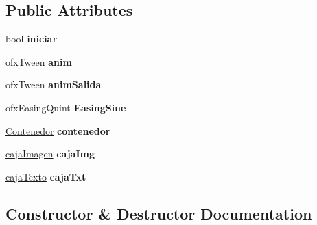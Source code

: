 \subsection*{Public Attributes}
\begin{DoxyCompactItemize}
\item 
\hypertarget{class_rafaga_a080e63c4e672ff07a6578b9f67e6fd0c}{}bool {\bfseries iniciar}\label{class_rafaga_a080e63c4e672ff07a6578b9f67e6fd0c}

\item 
\hypertarget{class_rafaga_a65a915875cbd8e82512e15cc67998144}{}ofx\+Tween {\bfseries anim}\label{class_rafaga_a65a915875cbd8e82512e15cc67998144}

\item 
\hypertarget{class_rafaga_a73b5f84ddef001adb62f421a3ccd6306}{}ofx\+Tween {\bfseries anim\+Salida}\label{class_rafaga_a73b5f84ddef001adb62f421a3ccd6306}

\item 
\hypertarget{class_rafaga_a605a36c40458258beed83fa463528893}{}ofx\+Easing\+Quint {\bfseries Easing\+Sine}\label{class_rafaga_a605a36c40458258beed83fa463528893}

\item 
\hypertarget{class_rafaga_a14f2da7cec4e2186c788c3295a951978}{}\hyperlink{class_contenedor}{Contenedor} {\bfseries contenedor}\label{class_rafaga_a14f2da7cec4e2186c788c3295a951978}

\item 
\hypertarget{class_rafaga_a0451257813dedb044706cae5bac8aef7}{}\hyperlink{classcaja_imagen}{caja\+Imagen} {\bfseries caja\+Img}\label{class_rafaga_a0451257813dedb044706cae5bac8aef7}

\item 
\hypertarget{class_rafaga_a62e14e8b4b593b501a87ebfc4c5ef038}{}\hyperlink{classcaja_texto}{caja\+Texto} {\bfseries caja\+Txt}\label{class_rafaga_a62e14e8b4b593b501a87ebfc4c5ef038}

\end{DoxyCompactItemize}


\subsection{Constructor \& Destructor Documentation}
\hypertarget{class_rafaga_a9e01a40ca76ac95f9e3aec362b0cbbc0}{}
